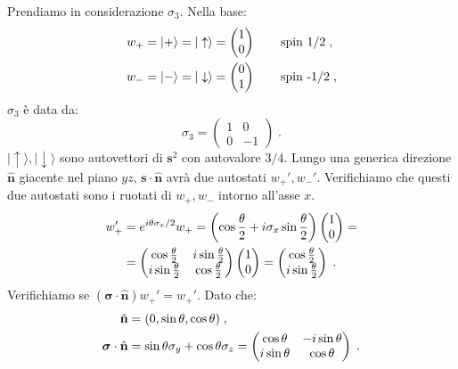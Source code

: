 \documentclass[10pt,a4paper]{report}
\theoremstyle{definition}
\numberwithin{equation}{section}
\newcommand{\ket}{\rangle}
\begin{document}
Prendiamo in considerazione $\sigma_3$. Nella base:
\begin{align}
w_+=|+\ket=|\uparrow\ket &=\left(\begin{matrix}
1 \\
0
\end{matrix}\right) \qquad \mbox{spin 1/2}\notag \;,\\
w_-=|-\ket=|\downarrow\ket &=\left(\begin{matrix}
0 \\
1
\end{matrix}\right)\qquad \mbox{spin -1/2}\;,
\end{align}
$\sigma_3$ è data da:
\begin{equation}
\sigma_3=\left(\begin{matrix}
1 & 0 \\
0 & -1
\end{matrix}\right)\;.
\end{equation}
$|\uparrow\ket,|\downarrow\ket$ sono autovettori di $\mathbf{s}^2$ con autovalore $3/4$. Lungo una generica direzione $\hat{\mathbf{n}}$ giacente nel piano $yz$, $\mathbf{s}\cdot\hat{\mathbf{n}}$ avrà due autostati $w_+',w_-'$. Verifichiamo che questi due autostati sono i ruotati di $w_+,w_-$ intorno all'asse $x$.
\begin{align}
w_+' &= e^{i\theta\sigma_x/2}w_+=\left(\cos\frac{\theta}{2}+i\sigma_x\sin\frac{\theta}{2}\right)\left(\begin{matrix}
1 \\
0
\end{matrix}\right) = \notag \\
&= \left(\begin{matrix}
\cos\frac{\theta}{2} & i\sin\frac{\theta}{2} \\
i\sin\frac{\theta}{2} & \cos\frac{\theta}{2}
\end{matrix}\right)\left(
\begin{matrix}
1 \\
0
\end{matrix}\right)=\left(
\begin{matrix}
\cos\frac{\theta}{2} \\
i\sin\frac{\theta}{2}
\end{matrix}\right)\;.
\end{align}
Verifichiamo se $(\boldsymbol{\sigma}\cdot\hat{\mathbf{n}})w_+'=w_+'$. Dato che:
\begin{align}
\hat{\mathbf{n}}&=(0,\sin\theta,\cos\theta)\;, \notag \\
\boldsymbol{\sigma}\cdot \hat{\mathbf{n}} &= \sin\theta \sigma_y+\cos\theta \sigma_z=
\left(\begin{matrix}
\cos\theta & -i\sin\theta \\
i\sin\theta & \cos\theta
\end{matrix}\right)\;.
\end{align}
\end{document}
